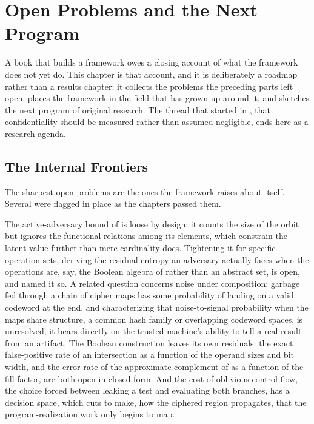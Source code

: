 
\chapter{Open Problems and the Next Program}
\label{ch:open-problems}

A book that builds a framework owes a closing account of what the framework
does not yet do. This chapter is that account, and it is deliberately a
roadmap rather than a results chapter: it collects the problems the
preceding parts left open, places the framework in the field that has grown
up around it, and sketches the next program of original research. The thread
that started in , that confidentiality
should be measured rather than assumed negligible, ends here as a research
agenda.

\section{The Internal Frontiers}
\label{sec:internal-frontiers}

The sharpest open problems are the ones the framework raises about itself.
Several were flagged in place as the chapters passed them.

The active-adversary bound of  is loose by design: it
counts the size of the orbit but ignores the functional relations among its
elements, which constrain the latent value further than mere cardinality
does. Tightening it for specific operation sets, deriving the residual
entropy an adversary actually faces when the operations are, say, the Boolean
algebra of  rather than an abstract set, is open, and
 named it so. A related question concerns noise
under composition: garbage fed through a chain of cipher maps has some
probability of landing on a valid codeword at the end, and characterizing
that noise-to-signal probability when the maps share structure, a common hash
family or overlapping codeword spaces, is unresolved; it bears directly on
the trusted machine's ability to tell a real result from an artifact. The
Boolean construction leaves its own residuals: the exact false-positive rate
of an intersection as a function of the operand sizes and bit width, and the
error rate of the approximate complement of  as a
function of the fill factor, are both open in closed form. And the cost of
oblivious control flow, the choice  forced between
leaking a test and evaluating both branches, has a decision space, which cuts
to make, how the ciphered region propagates, that the program-realization
work only begins to map.

